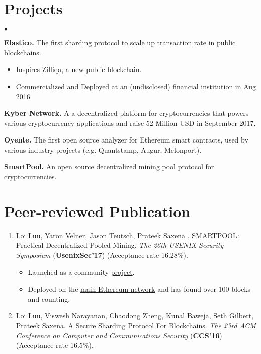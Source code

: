 \documentclass[margin,line]{res}
\newenvironment{list0}{
  \begin{list}{$\bullet$}{%
      \setlength{\itemsep}{0.08in}
      \setlength{\parsep}{0in} \setlength{\parskip}{0in}
      \setlength{\topsep}{0in} \setlength{\partopsep}{0in} 
      \setlength{\leftmargin}{0.0in}}}{\end{list}}
\begin{document}
\begin{resume}
\section{\sc Projects}
\begin{list0}
\item {\bf Elastico.} The first sharding protocol to scale up transaction rate in public blockchains.
  \begin{itemize}
    \item Inspires \href{https://zilliqa.com}{Zilliqa}, a new public blockchain.
    \item Commercialized and Deployed at an (undisclosed) financial institution in Aug 2016
  \end{itemize}

\item {\bf Kyber Network.} A  a decentralized platform for cryptocurrencies that powers various cryptocurrency applications and raise 52 Million USD in September 2017.
\item {\bf Oyente.} The first open source analyzer for Ethereum smart contracts, used by various industry projects (e.g. Quantstamp, Augur, Melonport).
\item {\bf SmartPool.} An open source decentralized mining pool protocol for cryptocurrencies.
\end{list0}



\section{\sc Peer-reviewed Publication}
\begin{enumerate}
  \item \underline{Loi Luu}, Yaron Velner, Jason Teutsch, Prateek Saxena . SMARTPOOL: Practical Decentralized Pooled Mining. \emph{The 26th USENIX Security Symposium} (\textbf{UsenixSec'17}) (Acceptance rate 16.28\%).
  \begin{itemize}
    \item Launched as a community \href{http://smartpool.io/}{project}.
    \item Deployed on the \href{https://etherscan.io/address/0xfc668AE14b0F7702c04b105448fE733D96C558DF}{main Ethereum network} and has found over 100 blocks and counting.
  \end{itemize}

  \item \underline{Loi Luu}, Viswesh Narayanan, Chaodong Zheng, Kunal Baweja, Seth Gilbert, Prateek Saxena. A Secure Sharding Protocol For Blockchains. \emph{The 23rd ACM Conference on Computer and Communications Security} (\textbf{CCS'16}) (Acceptance rate 16.5\%).


\end{enumerate}
\end{resume}
\end{document}
